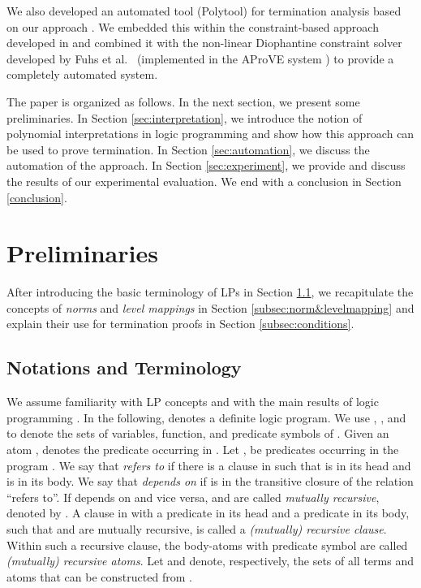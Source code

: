 \documentclass[envcountsame]{tlp}
\newcounter{ex:der-lastsymconsctr}
\begin{document}
We also developed an automated tool (\textsf{Polytool}) for termination analysis based on
our approach \cite{Nguyen&DeSchreye06}. 
We embedded this within the constraint-based approach developed in
\cite{Decorteetal98} and combined it with the non-linear Diophantine constraint solver
developed by  Fuhs et al.\ \cite{Fuhsc07} (implemented in the \textsf{AProVE} system
\cite{Giesletal06}) to provide a completely automated system.

The paper is organized as follows. In the next section, we present some preliminaries. In
Section \ref{sec:interpretation}, we introduce the notion of polynomial interpretations
in logic programming and show how this approach can be used to prove termination.
In Section \ref{sec:automation}, we discuss the automation of the approach. In
Section \ref{sec:experiment}, we provide and discuss the results of our experimental
evaluation. We end with a conclusion in Section \ref{conclusion}.

\section{Preliminaries}\label{sec:preliminaries}


After
introducing the basic terminology of LPs in Section
\ref{subsec:notation}, we recapitulate the concepts of \emph{norms} and \emph{level
mappings} in Section \ref{subsec:norm&levelmapping} and explain their use for termination
proofs in Section \ref{subsec:conditions}.


\subsection{Notations and Terminology}\label{subsec:notation}

We assume familiarity with LP concepts and with the main results of logic programming
\cite{Apt90,Lloyd87}. In the following,  denotes a definite logic program.
We use , , and  to denote the sets of
variables, function, and predicate symbols of . Given an atom , 
denotes the predicate occurring in . Let ,  be predicates occurring in the
program . We say that  \emph{refers to}  if there is a clause in  such that
 is in its head and  is in its body. We say that  \emph{depends on}  if
 is in the transitive closure of the relation ``refers to''. If  depends on 
and vice versa,  and  are called \emph{mutually recursive}, denoted by . A clause in  with a predicate  in its head and a predicate  in
its body, such that  and  are mutually recursive, is called a 
\emph{(mutually) recursive clause}. Within such a recursive clause, the body-atoms 
with predicate symbol  are called \emph{(mutually) recursive atoms}. 
Let  and  denote, respectively, the sets
of all terms and atoms that can be constructed from . 
\end{document}
